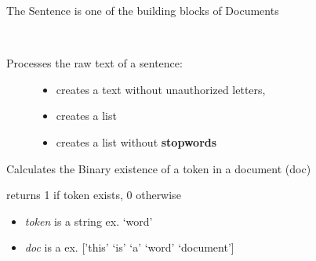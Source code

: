 \documentclass[letterpaper,10pt,english]{sphinxmanual}
\begin{document}
\begin{fulllineitems}
\label{theseus:theseus.processor.theseus.Sentence}
The Sentence is one of the building blocks of Documents

\begin{fulllineitems}
\label{theseus:theseus.processor.theseus.Sentence.cleanText}~\begin{description}
\item[{Processes the raw text of a sentence:}] \leavevmode\begin{itemize}
\item {} 
creates a  text without unauthorized letters,

\item {} 
creates a  list

\item {} 
creates a  list without \textbf{stopwords}

\end{itemize}

\end{description}

\end{fulllineitems}


\end{fulllineitems}


\begin{fulllineitems}
\label{theseus:theseus.processor.theseus.binary}
Calculates the Binary existence of a token in a document (doc)

returns 1 if token exists, 0 otherwise
\begin{itemize}
\item {} 
\emph{token} is a string               ex. `word'

\item {} 
\emph{doc} is a                  ex. {[}'this' `is' `a' `word' `document'{]}

\end{itemize}

\end{fulllineitems}
\end{document}
